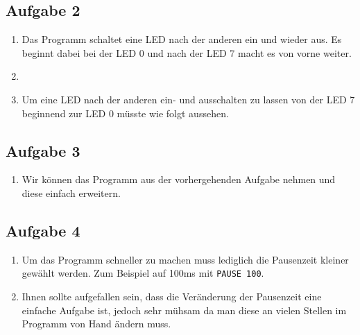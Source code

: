 \subsection{Aufgabe 2}
\begin{enumerate}[label=(\alph*)]
	\item Das Programm schaltet eine LED nach der anderen ein und wieder
	aus. Es beginnt dabei bei der LED 0 und nach der LED 7 macht es von
	vorne weiter.
	\item ~
	\item Um eine LED nach der anderen ein- und ausschalten zu lassen 
	von der LED 7 beginnend zur LED 0 müsste wie folgt aussehen.
	
\end{enumerate}
\fi

\ifteacher
\newpage
\subsection{Aufgabe 3}
\begin{enumerate}[label=(\alph*)]
	\item Wir können das Programm aus der vorhergehenden Aufgabe nehmen
	und diese einfach erweitern.
	
\end{enumerate}
\fi

\ifteacher
\newpage
\subsection{Aufgabe 4}
\begin{enumerate}[label=(\alph*)]
	\item Um das Programm schneller zu machen muss lediglich die Pausenzeit
	kleiner gewählt werden. Zum Beispiel auf 100ms mit
	\lstinline{PAUSE 100}.
	\item Ihnen sollte aufgefallen sein, dass die Veränderung der Pausenzeit
	eine einfache Aufgabe ist, jedoch sehr mühsam da man diese an vielen 
	Stellen im Programm von Hand ändern muss.
\end{enumerate}
\fi

\ifteacher
\newpage
